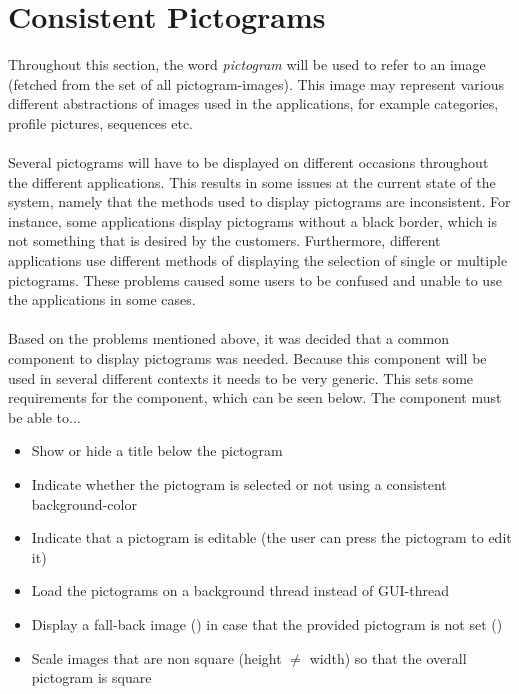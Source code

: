 
\section{Consistent Pictograms}
\label{sec:consistent_pictograms}

Throughout this section, the word \textit{pictogram} will be used to refer to an image (fetched from the set of all pictogram-images). This image may represent various different abstractions of images used in the \giraf applications, for example categories, profile pictures, sequences etc.
\\\\
Several pictograms will have to be displayed on different occasions throughout the different \giraf applications. This results in some issues at the current state of the system, namely that the methods used to display pictograms are inconsistent. For instance, some applications display pictograms without a black border, which is not something that is desired by the customers. Furthermore, different applications use different methods of displaying the selection of single or multiple pictograms. These problems caused some users to be confused and unable to use the applications in some cases. 
\\\\
Based on the problems mentioned above, it was decided that a common component to display pictograms was needed. Because this component will be used in several different contexts it needs to be very generic. This sets some requirements for the component, which can be seen below. The component must be able to...

\begin{itemize}
	\item Show or hide a title below the pictogram
	\item Indicate whether the pictogram is selected or not using a consistent background-color
	\item Indicate that a pictogram is editable (the user can press the pictogram to edit it)
	\item Load the pictograms on a background thread instead of GUI-thread 
	\item Display a fall-back image () in case that the provided pictogram is not set ()
	\item Scale images that are non square (height $\neq$ width) so that the overall pictogram is square
\end{itemize}

